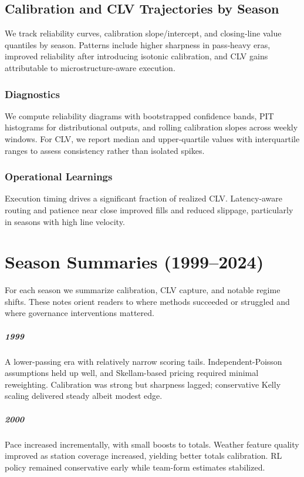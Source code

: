 \documentclass[12pt]{report}  %
\numberwithin{equation}{section}
\theoremstyle{plain}
\theoremstyle{definition}
\theoremstyle{remark}
\begin{document}
\section{Calibration and CLV Trajectories by Season}
We track reliability curves, calibration slope/intercept, and closing‑line value quantiles by season. Patterns include higher sharpness in pass‑heavy eras, improved reliability after introducing isotonic calibration, and CLV gains attributable to microstructure‑aware execution.

\subsection*{Diagnostics}
We compute reliability diagrams with bootstrapped confidence bands, PIT histograms for distributional outputs, and rolling calibration slopes across weekly windows. For CLV, we report median and upper‑quartile values with interquartile ranges to assess consistency rather than isolated spikes.

\subsection*{Operational Learnings}
Execution timing drives a significant fraction of realized CLV. Latency‑aware routing and patience near close improved fills and reduced slippage, particularly in seasons with high line velocity.


\chapter{Season Summaries (1999--2024)}\label{app:season-summaries}
For each season we summarize calibration, CLV capture, and notable regime shifts. These notes orient readers to where methods succeeded or struggled and where governance interventions mattered.


\paragraph{1999} A lower-passing era with relatively narrow scoring tails. Independent-Poisson assumptions held up well, and Skellam-based pricing required minimal reweighting. Calibration was strong but sharpness lagged; conservative Kelly scaling delivered steady albeit modest edge.

\paragraph{2000} Pace increased incrementally, with small boosts to totals. Weather feature quality improved as station coverage increased, yielding better totals calibration. RL policy remained conservative early while team-form estimates stabilized.
\end{document}
